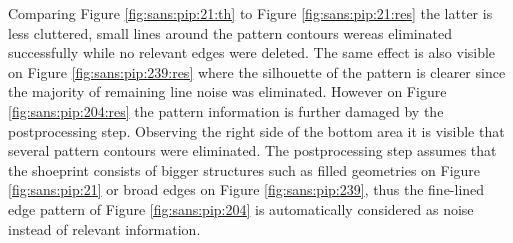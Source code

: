 \documentclass[draft,final]{vutinfth} %
\begin{document}
Comparing Figure \ref{fig:sans:pip:21:th} to  Figure \ref{fig:sans:pip:21:res} the latter is less cluttered, small lines around the pattern contours wereas eliminated successfully while no relevant edges were deleted.
The same effect is also visible on Figure \ref{fig:sans:pip:239:res} where the silhouette of the pattern is clearer since the majority of remaining line noise was eliminated.
However on Figure \ref{fig:sans:pip:204:res} the pattern information is further damaged by the postprocessing step.
Observing the right side of the bottom area it is visible that several pattern contours were eliminated.
The postprocessing step assumes that the shoeprint consists of bigger structures such as filled geometries on Figure \ref{fig:sans:pip:21} or broad edges on Figure \ref{fig:sans:pip:239}, thus the fine-lined edge pattern of Figure \ref{fig:sans:pip:204} is automatically considered as noise instead of relevant information.
\end{document}
